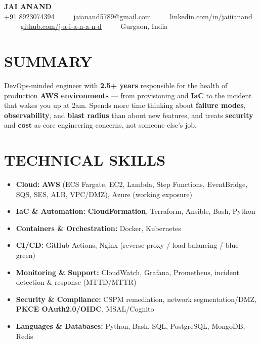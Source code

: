 \documentclass[letterpaper,10pt]{article}
\renewcommand{\normalsize}{%
  \fontsize{10.1}{12.25}\selectfont
}
\begin{document}
\begin{center}
    {\Huge \textbf{JAI ANAND}} \\ \vspace{4pt}
    \small
    \href{tel:+918923074394}{\underline{+91 8923074394}} ~~\textbullet~~ 
    \href{mailto:jaianand5789@gmail.com}{\underline{jaianand5789@gmail.com}} ~~\textbullet~~ 
    \href{https://linkedin.com/in/jaiiianand/}{\underline{linkedin.com/in/jaiiianand}} ~~\textbullet~~ 
    \href{https://github.com/j-a-i-a-n-a-n-d}{\underline{github.com/j-a-i-a-n-a-n-d}} ~~\textbullet~~
    Gurgaon, India
\end{center}

\section{SUMMARY}
DevOps-minded engineer with \textbf{2.5+ years} responsible for the health of production \textbf{AWS environments} --- from provisioning and \textbf{IaC} to the incident that wakes you up at 2am. Spends more time thinking about \textbf{failure modes}, \textbf{observability}, and \textbf{blast radius} than about new features, and treats \textbf{security} and \textbf{cost} as core engineering concerns, not someone else's job.

\section{TECHNICAL SKILLS}
  \begin{itemize}[leftmargin=0.0in, label={}, itemsep=1pt, parsep=0pt, topsep=0pt]
    \item \normalsize{
     \textbf{\normalsize Cloud:}{ \textbf{AWS} (ECS Fargate, EC2, Lambda, Step Functions, EventBridge, SQS, SES, ALB, VPC/DMZ), Azure (working exposure)}
    }
    \item \normalsize{
     \textbf{\normalsize IaC \& Automation:}{ \textbf{CloudFormation}, Terraform, Ansible, Bash, Python}
    }
    \item \normalsize{
     \textbf{\normalsize Containers \& Orchestration:}{ Docker, Kubernetes}
    }
    \item \normalsize{
     \textbf{\normalsize CI/CD:}{ GitHub Actions, Nginx (reverse proxy / load balancing / blue-green)}
    }
    \item \normalsize{
     \textbf{\normalsize Monitoring \& Support:}{ CloudWatch, Grafana, Prometheus, incident detection \& response (MTTD/MTTR)}
    }
    \item \normalsize{
     \textbf{\normalsize Security \& Compliance:}{ CSPM remediation, network segmentation/DMZ, \textbf{PKCE OAuth2.0/OIDC}, MSAL/Cognito}
    }
    \item \normalsize{
     \textbf{\normalsize Languages \& Databases:}{ Python, Bash, SQL, PostgreSQL, MongoDB, Redis}
    }
  \end{itemize}
\end{document}
